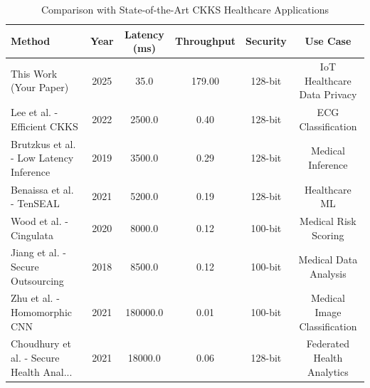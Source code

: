 \begin{table}[t]
\centering
\caption{Comparison with State-of-the-Art CKKS Healthcare Applications}
\label{tab:literature_comparison}
\begin{tabular}{|l|c|c|c|c|c|}
\hline
\textbf{Method} & \textbf{Year} & \textbf{Latency (ms)} & \textbf{Throughput} & \textbf{Security} & \textbf{Use Case} \\
\hline
\rowcolor{yellow!30}
This Work (Your Paper) & 2025 & 35.0 & 179.00 & 128-bit & IoT Healthcare Data Privacy \\
\hline
Lee et al. - Efficient CKKS & 2022 & 2500.0 & 0.40 & 128-bit & ECG Classification \\
\hline
Brutzkus et al. - Low Latency Inference & 2019 & 3500.0 & 0.29 & 128-bit & Medical Inference \\
\hline
Benaissa et al. - TenSEAL & 2021 & 5200.0 & 0.19 & 128-bit & Healthcare ML \\
\hline
Wood et al. - Cingulata & 2020 & 8000.0 & 0.12 & 100-bit & Medical Risk Scoring \\
\hline
Jiang et al. - Secure Outsourcing & 2018 & 8500.0 & 0.12 & 100-bit & Medical Data Analysis \\
\hline
Zhu et al. - Homomorphic CNN & 2021 & 180000.0 & 0.01 & 100-bit & Medical Image Classification \\
\hline
Choudhury et al. - Secure Health Anal... & 2021 & 18000.0 & 0.06 & 128-bit & Federated Health Analytics \\
\hline
\end{tabular}
\end{table}
